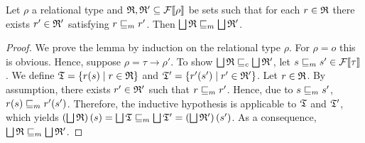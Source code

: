 \documentclass[a4paper,twoside,notitlepage,openright,11pt]{report}
\begin{document}

\begin{lemma}
  \label{lem:mmonunpoint}
  Let $\rho$ a relational type and $\mathfrak R,\mathfrak R'\subseteq{\mathcal F}\llbracket\rho\rrbracket$ be sets such that for each $r\in\mathfrak R$ there exists $r'\in\mathfrak R'$ satisfying $r\sqsubseteq_m r'$. Then $\bigsqcup\mathfrak R\sqsubseteq_m\bigsqcup\mathfrak R'$.
\end{lemma}
\begin{proof}
  We prove the lemma by induction on the relational type $\rho$. For $\rho=o$ this is obvious. Hence, suppose $\rho=\tau\to\rho'$. To show $\bigsqcup\mathfrak R\sqsubseteq_c\bigsqcup\mathfrak R'$, let $s\sqsubseteq_m s'\in{\mathcal F}\llbracket\tau\rrbracket$. We define $\mathfrak T=\{r(s)\mid r\in\mathfrak R\}$ and $\mathfrak T'=\{r'(s')\mid r'\in\mathfrak R'\}$. Let $r\in\mathfrak R$. By assumption, there exists $r'\in\mathfrak R'$ such that $r\sqsubseteq_m r'$. Hence, due to $s\sqsubseteq_m s'$, $r(s)\sqsubseteq_m r'(s')$.
  Therefore, the inductive hypothesis is applicable to $\mathfrak T$ and $\mathfrak T'$, which yields $\left(\bigsqcup\mathfrak R\right)(s)=\bigsqcup\mathfrak T\sqsubseteq_m\bigsqcup\mathfrak T'=\left(\bigsqcup\mathfrak R'\right)(s')$. As a consequence, $\bigsqcup\mathfrak R\sqsubseteq_m\bigsqcup\mathfrak R'$.
\end{proof}
\end{document}
